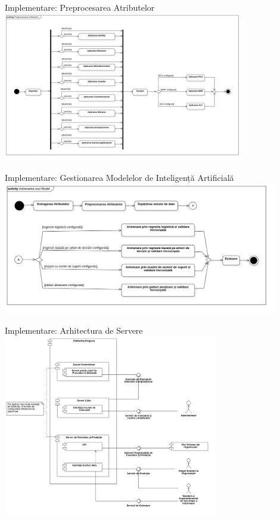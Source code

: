 \begin{frame}{Implementare: Preprocesarea Atributelor}
	\includegraphics[width=0.8\textwidth, center]{components/images/diagrams/activity_diagram_attribute_preprocessing.png}
    \captionsetup{justification=centering,margin=1cm}
\end{frame}

\begin{frame}{Implementare: Gestionarea Modelelor de Inteligență Artificială}
	\includegraphics[width=0.9\textwidth, center]{components/images/diagrams/activity_diagram_model_training.png}
    \captionsetup{justification=centering,margin=1cm}
\end{frame}

\begin{frame}{Implementare: Arhitectura de Servere}
	\includegraphics[width=0.7\textwidth, center]{components/images/diagrams/component_diagram_servers.png}
    \captionsetup{justification=centering,margin=1cm}
\end{frame}

